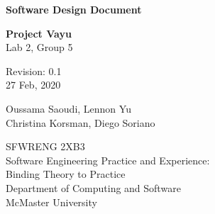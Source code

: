 \documentclass[12pt]{article}
\begin{document}
\begin{titlepage}
    \begin{center}
        \vspace*{1cm}
            
        \Huge
        \textbf{Software Design Document}

        \LARGE
        \vspace{0.5cm}
        \textbf{Project Vayu}\\
        \vspace{0.2cm}
        Lab 2, Group 5

        \vspace{0.5cm}
        Revision: 0.1\\
        \vspace{0.2cm}
        27 Feb, 2020
            
        \vspace{1.5cm}
            
        \Large
        Oussama Saoudi, Lennon Yu\\
        Christina Korsman, Diego Soriano

        \vfill
            
        \vspace{0.8cm}
                        
        \large
        SFWRENG 2XB3\\
        Software Engineering Practice and Experience:\\
        Binding Theory to Practice\\
        Department of Computing and Software\\
        McMaster University            
    \end{center}
\end{titlepage}
\end{document}
